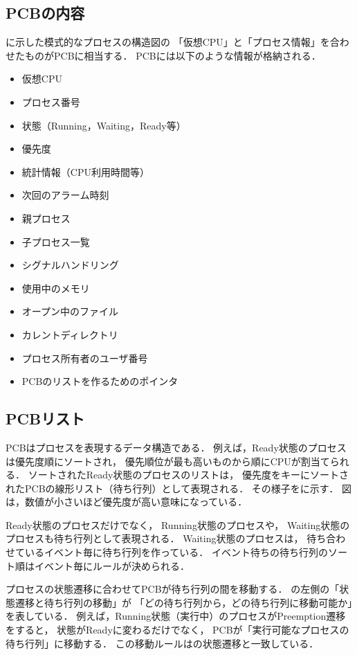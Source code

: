 \subsection{PCBの内容}
に示した模式的なプロセスの構造図の
「仮想CPU」と「プロセス情報」を合わせたものがPCBに相当する．
PCBには以下のような情報が格納される．

\begin{itemize}
\item 仮想CPU
\item プロセス番号
\item 状態（Running，Waiting，Ready等）
\item 優先度
\item 統計情報（CPU利用時間等）
\item 次回のアラーム時刻
\item 親プロセス
\item 子プロセス一覧
\item シグナルハンドリング
\item 使用中のメモリ
\item オープン中のファイル
\item カレントディレクトリ
\item プロセス所有者のユーザ番号
\item PCBのリストを作るためのポインタ
\end{itemize}

\subsection{PCBリスト}
PCBはプロセスを表現するデータ構造である．
例えば，Ready状態のプロセスは優先度順にソートされ，
優先順位が最も高いものから順にCPUが割当てられる．
ソートされたReady状態のプロセスのリストは，
優先度をキーにソートされたPCBの線形リスト（待ち行列）として表現される．
その様子をに示す．
図は，数値が小さいほど優先度が高い意味になっている．


Ready状態のプロセスだけでなく，
Running状態のプロセスや，
Waiting状態のプロセスも待ち行列として表現される．
Waiting状態のプロセスは，
待ち合わせているイベント毎に待ち行列を作っている．
イベント待ちの待ち行列のソート順はイベント毎にルールが決められる．

プロセスの状態遷移に合わせてPCBが待ち行列の間を移動する．
の左側の「状態遷移と待ち行列の移動」が
「どの待ち行列から，どの待ち行列に移動可能か」を表している．
例えば，Running状態（実行中）のプロセスがPreemption遷移をすると，
状態がReadyに変わるだけでなく，
PCBが「実行可能なプロセスの待ち行列」に移動する．
この移動ルールはの状態遷移と一致している．

